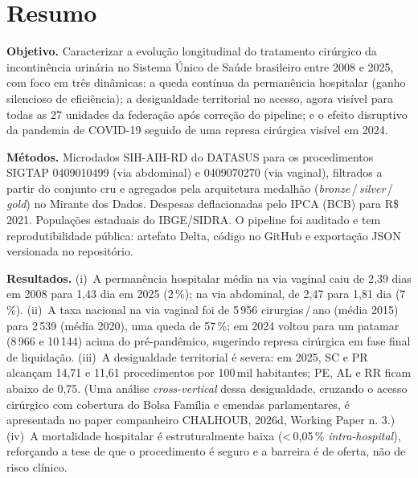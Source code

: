 \documentclass[12pt,a4paper,oneside]{article}
\newcommand{\rs}{R\$\,}
\begin{document}
\section*{Resumo}
\begin{singlespace}\small\noindent
\textbf{Objetivo.} Caracterizar a evolução longitudinal do tratamento
cirúrgico da incontinência urinária no Sistema Único de Saúde
brasileiro entre 2008 e 2025, com foco em três dinâmicas: a queda
contínua da permanência hospitalar (ganho silencioso de eficiência);
a desigualdade territorial no acesso, agora visível para todas as
27 unidades da federação após correção do pipeline; e o efeito
disruptivo da pandemia de COVID-19 seguido de uma represa cirúrgica
visível em 2024.

\textbf{Métodos.} Microdados SIH-AIH-RD do DATASUS para os
procedimentos SIGTAP 0409010499 (via abdominal) e 0409070270
(via vaginal), filtrados a partir do conjunto cru e agregados pela
arquitetura medalhão (\textit{bronze}\,/\,\textit{silver}\,/\,\textit{gold})
no Mirante dos Dados. Despesas deflacionadas pelo IPCA (BCB) para
\rs 2021. Populações estaduais do IBGE/SIDRA. O pipeline foi
auditado e tem reprodutibilidade pública: artefato Delta, código
no GitHub e exportação JSON versionada no repositório.

\textbf{Resultados.} (i)~A permanência hospitalar média na via
vaginal caiu de 2{,}39 dias em 2008 para 1{,}43 dia em 2025
(2\,\%); na via abdominal, de 2{,}47 para
1{,}81 dia (7\,\%). (ii)~A taxa nacional na via
vaginal foi de 5\,956 cirurgias\,/\,ano (média 2015)
para 2\,539 (média 2020), uma queda de 57\,\%; em
2024 voltou para um patamar (8\,966 e 10\,144) acima
do pré-pandêmico, sugerindo represa cirúrgica em fase final de
liquidação. (iii)~A desigualdade territorial é severa: em 2025,
SC e PR alcançam 14{,}71 e 11{,}61 procedimentos por 100\,mil
habitantes; PE, AL e RR ficam abaixo de 0{,}75. (Uma análise
\textit{cross-vertical} dessa desigualdade, cruzando o acesso
cirúrgico com cobertura do Bolsa Família e emendas
parlamentares, é apresentada no paper companheiro CHALHOUB,
2026d, Working Paper n. 3.) (iv)~A mortalidade hospitalar é
estruturalmente baixa (\textless\,0{,}05\,\% \textit{intra-hospital}),
reforçando a tese de que o procedimento é seguro e a barreira é
de oferta, não de risco clínico.


\end{singlespace}
\end{document}
